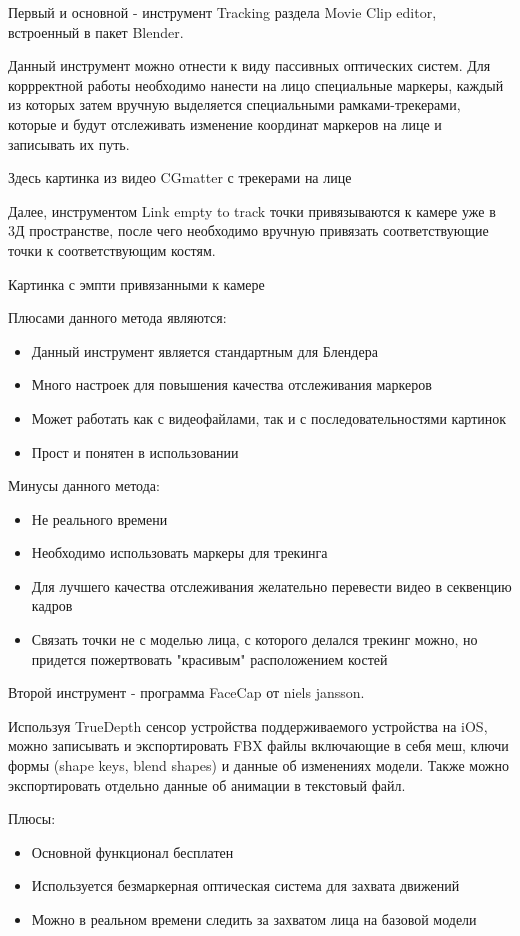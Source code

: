 Первый и основной - инструмент Tracking раздела Movie Clip editor, встроенный в пакет Blender.

Данный инструмент можно отнести к виду пассивных оптических систем. Для коррректной работы необходимо нанести на лицо специальные маркеры, каждый из которых затем вручную выделяется специальными рамками-трекерами, которые и будут отслеживать изменение координат маркеров на лице и записывать их путь.

Здесь картинка из видео CGmatter с трекерами на лице

Далее, инструментом Link empty to track точки привязываются к камере уже в 3Д пространстве, после чего необходимо вручную привязать соответствующие точки к соответствующим костям.

Картинка с эмпти привязанными к камере

Плюсами данного метода являются:
\begin{itemize}
	\item Данный инструмент является стандартным для Блендера
	\item Много настроек для повышения качества отслеживания маркеров
	\item Может работать как с видеофайлами, так и с последовательностями картинок
	\item Прост и понятен в использовании
\end{itemize}
Минусы данного метода:
\begin{itemize}
	\item Не реального времени
	\item Необходимо использовать маркеры для трекинга
	\item Для лучшего качества отслеживания желательно перевести видео в секвенцию кадров
	\item Связать точки не с моделью лица, с которого делался трекинг можно, но придется пожертвовать "красивым" расположением костей
\end{itemize}

Второй инструмент - программа FaceCap от niels jansson. 

Используя TrueDepth сенсор устройства поддерживаемого устройства на iOS, можно записывать и экспортировать FBX файлы включающие в себя меш, ключи формы (shape keys, blend shapes) и данные об изменениях модели. Также можно экспортировать отдельно данные об анимации в текстовый файл.

Плюсы:
\begin{itemize}
	\item Основной функционал бесплатен
	\item Используется безмаркерная оптическая система для захвата движений
	\item Можно в реальном времени следить за захватом лица на базовой модели
\end{itemize}

